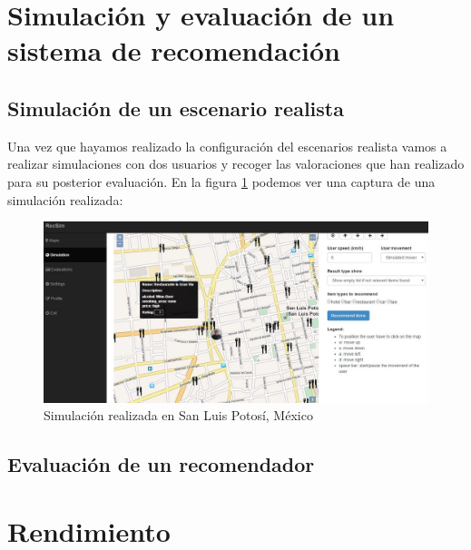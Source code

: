 \section{Simulación y evaluación de un sistema de recomendación}

\subsection{Simulación de un escenario realista}

Una vez que hayamos realizado la configuración del escenarios realista vamos a realizar simulaciones con dos usuarios y recoger las valoraciones que han realizado para su posterior evaluación. En la figura \ref{simulacionYEvaluacion} podemos ver una captura de una simulación realizada:

\begin{figure}[H]
	\centering\includegraphics[scale=0.35]{imagenes/explotacion/6.jpg}
	\caption{Simulación realizada en San Luis Potosí, México}
	\label{simulacionYEvaluacion}
\end{figure}

\subsection{Evaluación de un recomendador}




\section{Rendimiento}


